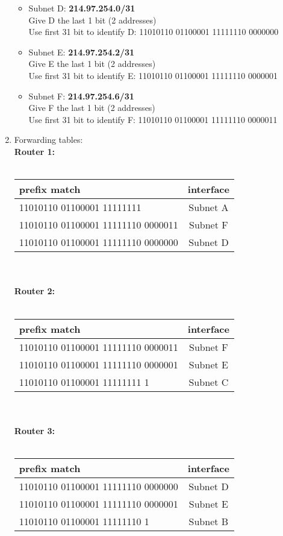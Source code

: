 \documentclass[11pt]{article}
\begin{document}
\begin{enumerate}
\begin{itemize}
		\item Subnet D: \textbf{214.97.254.0/31}
		\\ Give D the last 1 bit (2 addresses)
		\\ Use first 31 bit to identify D:
		11010110 01100001 11111110 0000000
		\item Subnet E: \textbf{214.97.254.2/31}
		\\ Give E the last 1 bit (2 addresses)
		\\ Use first 31 bit to identify E:
		11010110 01100001 11111110 0000001
		\item Subnet F: \textbf{214.97.254.6/31}
		\\ Give F the last 1 bit (2 addresses)
		\\ Use first 31 bit to identify F:
		11010110 01100001 11111110 0000011
	\end{itemize}
	\item Forwarding tables:
	\\ \textbf{Router 1:} \\ \\
	\begin{tabular}{|l|c|}
	\hline prefix match &	interface \\
	\hline 11010110 01100001 11111111 &	Subnet A \\
	\hline 11010110 01100001 11111110 0000011&	Subnet F \\
	\hline 11010110 01100001 11111110 0000000&	Subnet D \\
	\hline
	\end{tabular}
	\\
	\\ \textbf{Router 2:} \\\\
	\begin{tabular}{|l|c|}
	\hline prefix match &	interface \\
	\hline 11010110 01100001 11111110 0000011&	Subnet F \\
	\hline 11010110 01100001 11111110 0000001&	Subnet E \\
	\hline 11010110 01100001 11111111 1&	Subnet C \\
	\hline
	\end{tabular}
	\\\\ 
	\textbf{Router 3:} \\\\
	\begin{tabular}{|l|c|}
	\hline prefix match &	interface \\
	\hline 11010110 01100001 11111110 0000000&	Subnet D \\
	\hline 11010110 01100001 11111110 0000001&	Subnet E \\
	\hline 11010110 01100001 11111110 1&	Subnet B \\
	\hline
	\end{tabular}
	\\
	
\end{enumerate}
\end{document}
